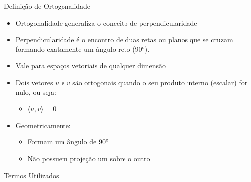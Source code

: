 \documentclass{beamer}
\begin{document}
\begin{frame}{Definição de Ortogonalidade}


\vspace{0.5cm}

\begin{itemize}
    \item Ortogonalidade generaliza o conceito de perpendicularidade
    \item Perpendicularidade é o encontro de duas retas ou planos que se cruzam formando exatamente um ângulo reto (90°).
    \item Vale para espaços vetoriais de qualquer dimensão
    \item Dois vetores $u$ e $v$ são ortogonais quando o seu produto interno (escalar) for nulo, ou seja:
    \begin{itemize}
        \item $\langle u, v \rangle = 0$
    \end{itemize}
    \item Geometricamente:
    \begin{itemize}
        \item Formam um ângulo de 90°
        \item Não possuem projeção um sobre o outro
    \end{itemize}
\end{itemize}

\vspace{0.5cm}

\end{frame}
\begin{frame}{Termos Utilizados}



\end{frame}
\end{document}
